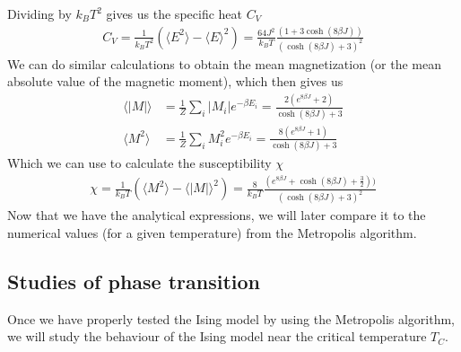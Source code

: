 \documentclass[12pt]{article}
\begin{document}
Dividing by $k_B T^2$ gives us the specific heat $C_V$
\begin{align}
C_V = \frac{1}{k_BT^2} \left( \langle E^2 \rangle
- \langle E \rangle^2 \right) = \frac{64J^2}{k_B T} \frac{(1+3\cosh(8\beta J))}{(\cosh(8\beta J) + 3)^2}
\label{eq:heat_capacity}
\end{align}
We can do similar calculations to obtain the mean magnetization (or the mean absolute value of the magnetic moment), which then gives us
\begin{align*}
\langle |M|\rangle &= \frac{1}{Z} \displaystyle \sum_i |M_i| e^{-\beta E_i} = \frac{2(e^{8\beta J} + 2)}{\cosh(8\beta J) + 3} \\
\langle M^2\rangle &= \frac{1}{Z}\displaystyle \sum_i M_i^2e^{-\beta E_i} = \frac{8(e^{8\beta J} + 1)}{\cosh(8\beta J) + 3}
\end{align*}
Which we can use to calculate the susceptibility $\chi$
\begin{align}
\chi = \frac{1}{k_B T} \left(\langle M^2 \rangle - \langle |M| \rangle^2\right) = \frac{8}{k_B T} \frac{(e^{8\beta J}+ \cosh(8\beta J) + \frac{3}{2}))}{(\cosh(8\beta J) + 3)^2}
\label{eq:suceptibility}
\end{align} 
Now that we have the analytical expressions, we will later compare it to the numerical values (for a given temperature) from the Metropolis algorithm.
\FloatBarrier

\subsection{Studies of phase transition}
Once we have properly tested the Ising model by using the Metropolis algorithm, we will study the behaviour of the Ising model near the critical temperature $T_C$. 
\end{document}
